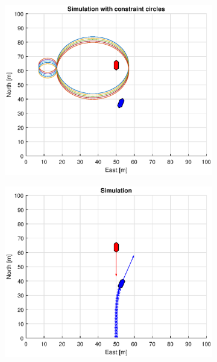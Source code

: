 \begin{figure}[!b]
\begin{subfigure}[b]{0.499\textwidth}
    \end{subfigure}
    \hfill
    \\
    \begin{subfigure}[b]{0.49\textwidth}
        \centering
        \includegraphics[width=\textwidth]{Images/Figures/Enkel_HO/Simple0_f1_Frame2}
    \end{subfigure}
    \hfill
    \begin{subfigure}[b]{0.499\textwidth}
        \centering
        \includegraphics[width=\textwidth]{Images/Figures/Enkel_HO/Simple0_f600_Frame2}

\end{subfigure}
\end{figure}
